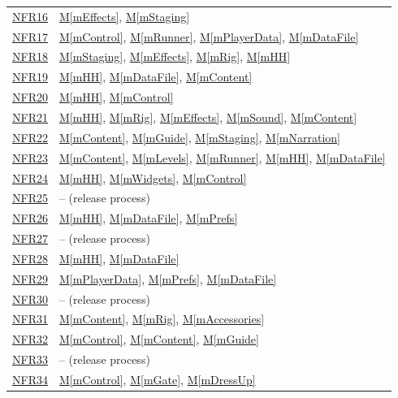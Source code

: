 \documentclass[10pt, titlepage]{article}
\newcommand{\srsurl}{https://team-hindsight.github.io/ophthamology-game/SRS/SRS.pdf}
\newcommand{\srsitemref}[2]{\href{\srsurl\#nameddest=#1}{#2}}
\newcommand{\mref}[1]{\texorpdfstring{\hyperref[md:#1]{M\ref*{#1}}}{M\ref*{#1}}}
\begin{document}
\begin{longtable}{@{}p{}p{}@{}}
\srsitemref{NFR_Flashing}{NFR16} & \mref{mEffects}, \mref{mStaging} \\
\srsitemref{NFR_Reliability}{NFR17} & \mref{mControl}, \mref{mRunner}, \mref{mPlayerData}, \mref{mDataFile} \\
\srsitemref{NFR_DeviceHeat}{NFR18} & \mref{mStaging}, \mref{mEffects}, \mref{mRig}, \mref{mHH} \\
\srsitemref{NFR_Offline}{NFR19} & \mref{mHH}, \mref{mDataFile}, \mref{mContent} \\
\srsitemref{NFR_Installability}{NFR20} & \mref{mHH}, \mref{mControl} \\
\srsitemref{NFR_InstallSize}{NFR21} & \mref{mHH}, \mref{mRig}, \mref{mEffects}, \mref{mSound}, \mref{mContent} \\
\srsitemref{NFR_ClinicalAccuracy}{NFR22} & \mref{mContent}, \mref{mGuide}, \mref{mStaging}, \mref{mNarration} \\
\srsitemref{NFR_Maintainability}{NFR23} & \mref{mContent}, \mref{mLevels}, \mref{mRunner}, \mref{mHH}, \mref{mDataFile} \\
\srsitemref{NFR_Portability}{NFR24} & \mref{mHH}, \mref{mWidgets}, \mref{mControl} \\
\srsitemref{NFR_DependencyTesting}{NFR25} & -- (release process) \\
\srsitemref{NFR_DataProtection}{NFR26} & \mref{mHH}, \mref{mDataFile}, \mref{mPrefs} \\
\srsitemref{NFR_Integrity}{NFR27} & -- (release process) \\
\srsitemref{NFR_Privacy}{NFR28} & \mref{mHH}, \mref{mDataFile} \\
\srsitemref{NFR_Minimization}{NFR29} & \mref{mPlayerData}, \mref{mPrefs}, \mref{mDataFile} \\
\srsitemref{NFR_Immunity}{NFR30} & -- (release process) \\
\srsitemref{NFR_Inclusivity}{NFR31} & \mref{mContent}, \mref{mRig}, \mref{mAccessories} \\
\srsitemref{NFR_NoClaims}{NFR32} & \mref{mControl}, \mref{mContent}, \mref{mGuide} \\
\srsitemref{NFR_Licensing}{NFR33} & -- (release process) \\
\srsitemref{NFR_StoreCompliance}{NFR34} & \mref{mControl}, \mref{mGate}, \mref{mDressUp} \\

\end{longtable}
\end{document}
